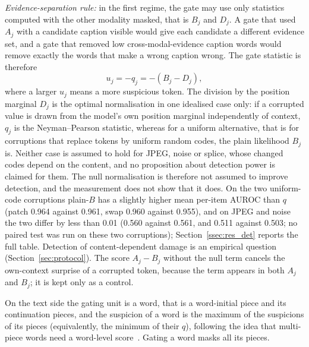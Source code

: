 \emph{Evidence-separation rule:} in the first regime, the gate may use only statistics computed with the other modality
masked, that is $B_j$ and $D_j$.
A gate that used $A_j$ with a candidate caption visible would give each candidate a different evidence set, and a gate that removed
low cross-modal-evidence caption words would remove exactly the words that make a wrong caption wrong.
The gate statistic is therefore
\begin{equation}
u_j=-q_j=-(B_j-D_j),
\label{eq:suspicion}
\end{equation}
where a larger $u_j$ means a more suspicious token.
The division by the position marginal $D_j$ is the optimal normalisation in one idealised case only: if a corrupted value is
drawn from the model's own position marginal independently of context, $q_j$ is the Neyman--Pearson statistic, whereas for
a uniform alternative, that is for corruptions that replace tokens by uniform random codes, the plain likelihood $B_j$ is.
Neither case is assumed to hold for JPEG, noise or splice, whose changed codes depend on the content, and no proposition about
detection power is claimed for them.
The null normalisation is therefore not assumed to improve detection, and the measurement does not show that it does.
On the two uniform-code corruptions plain-$B$ has a slightly higher mean per-item AUROC than $q$ (patch 0.964 against 0.961,
swap 0.960 against 0.955), and on JPEG and noise the two differ by less than 0.01 (0.560 against 0.561, and 0.511 against 0.503;
no paired test was run on these two corruptions); Section~\ref{ssec:res_det} reports the full table.
Detection of content-dependent damage is an empirical question (Section~\ref{sec:protocol}).
The score $A_j-B_j$ without the null term cancels the own-context surprise of a corrupted token, because the term appears in
both $A_j$ and $B_j$; it is kept only as a control.

On the text side the gating unit is a word, that is a word-initial piece and its continuation pieces, and the suspicion of a
word is the maximum of the suspicions of its pieces (equivalently, the minimum of their $q$), following the idea that
multi-piece words need a word-level score~\cite{kauf2023plwl2r}.
Gating a word masks all its pieces.

\begin{algorithm}[t]
\caption{\textsc{ReliabilityScores}: suspicion of every token of one modality}\label{alg:reliability}
\end{algorithm}

